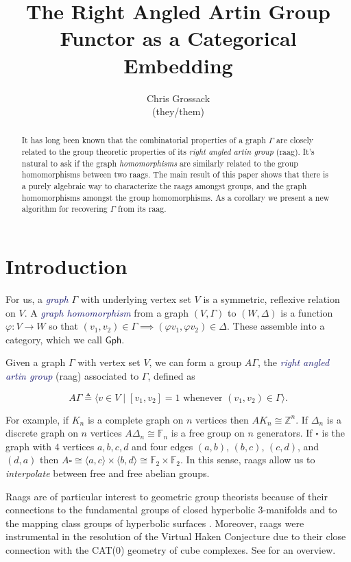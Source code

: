 \documentclass[12pt]{article}
\author{Chris Grossack\\ (they/them)}
\title{The Right Angled Artin Group Functor as a Categorical Embedding}
\theoremstyle{definition}
\theoremstyle{theorem}
\newcommand{\teq}{\triangleq}
\newcommand*{\important}[1]{\textcolor{MidnightBlue}{\emph{#1}}}
\begin{document}
\maketitle

\begin{abstract}
  It has long been known that the combinatorial properties of a graph $\Gamma$
  are closely related to the group theoretic properties of its 
  \emph{right angled artin group} (raag). It's natural to ask if the 
  graph \emph{homomorphisms} are similarly related to the group homomorphisms 
  between two raags. The main result of this paper shows that there 
  is a purely algebraic way to characterize the raags amongst groups, and 
  the graph homomorphisms amongst the group homomorphisms. 
  As a corollary we 
  present a new algorithm for recovering $\Gamma$ from its raag.
\end{abstract}

\section{Introduction}
\label{intro}
  For us, a \important{graph} $\Gamma$ with underlying vertex set $V$ is a 
  symmetric, reflexive relation on $V$. A \important{graph homomorphism} from 
  a graph $(V,\Gamma)$ to $(W,\Delta)$ is a 
  function $\varphi : V \to W$ so that $(v_1, v_2) \in \Gamma \implies (\varphi v_1, \varphi v_2) \in \Delta$.
  These assemble into a category, which we call $\mathsf{Gph}$.

  Given a graph $\Gamma$ with vertex set $V$, we can form a group $A\Gamma$, the 
  \important{right angled artin group} (raag) associated to $\Gamma$, defined as

  \[ A\Gamma \teq \langle v \in V \mid [v_1, v_2] = 1 \text{ whenever } (v_1,v_2) \in \Gamma \rangle .\]

  For example, if $K_n$ is a complete graph on $n$ vertices then 
  $AK_n \cong \mathbb{Z}^n$. If $\Delta_n$ is a discrete graph on $n$ vertices
  $A\Delta_n \cong \mathbb{F}_n$ is a free group on $n$ generators. 
  If $\square$ is the graph with $4$ vertices $a,b,c,d$ and 
  four edges $(a,b)$, $(b,c)$, $(c,d)$, and $(d,a)$ then $A \square \cong 
  \langle a, c \rangle \times \langle b, d \rangle \cong \mathbb{F}_2 \times \mathbb{F}_2$.
  In this sense, raags allow us to \emph{interpolate} between free and free
  abelian groups. 

  Raags are of particular interest to geometric group theorists because
  of their connections to the fundamental groups of closed hyperbolic
  $3$-manifolds \cite{servatiusSurfaceSubgroupsGraph1989} 
  and to the mapping class groups of hyperbolic surfaces 
  \cite{kimGeometryCurveGraph2014}. Moreover, raags were instrumental in
  the resolution of the Virtual Haken Conjecture \cite{agolVirtualHakenConjecture2013}
  due to their close connection with the CAT(0) geometry of cube complexes. 
  See \cite{bestvinaGeometricGroupTheory2013} for an overview.
\end{document}
